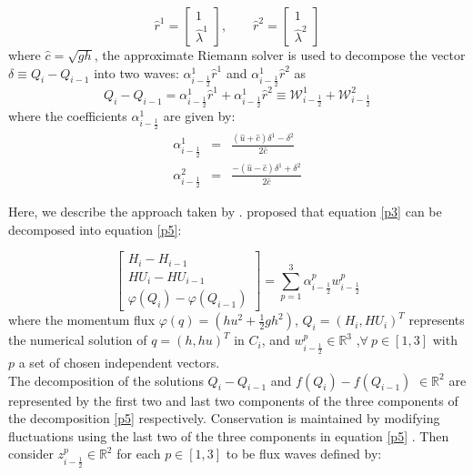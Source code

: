 \documentclass[10pt,a4paper]{article}
\begin{document}
	\begin{equation}
		\hat{r}^1 =  \begin{bmatrix} 1 \\ 	\hat{\lambda}^1 \end{bmatrix}, \qquad 	\hat{r}^2 =  
		\begin{bmatrix} 1 \\ 	\hat{\lambda}^2 \end{bmatrix}
		\label{vec}
	\end{equation}
	where $\hat{c} = \sqrt{gh}$, the approximate Riemann solver is used to decompose the vector  $ \delta \equiv Q_{i} - Q_{i-1}$ into two waves: $\alpha_{i-\frac{1}{2}}^{1} \hat{r}^1$ and $\alpha_{i-\frac{1}{2}}^{1} \hat{r}^2$ as 
	\begin{equation}
		Q_{i} - Q_{i-1} = \alpha_{i-\frac{1}{2}}^{1} \hat{r}^1 + \alpha_{i-\frac{1}{2}}^{1} \hat{r}^2 \equiv \mathcal{W}_{i-\frac{1}{2}}^{1} + \mathcal{W}_{i-\frac{1}{2}}^{2}
	\end{equation}
	where the coefficients $\alpha_{i-\frac{1}{2}}^{1}$ are given by:
	\begin{eqnarray}
		\alpha_{i-\frac{1}{2}}^{1} &=& \frac{(\hat{u} + \hat{c})\delta^{1} - \delta^2}{2\hat{c}}\\
		\alpha_{i-\frac{1}{2}}^{2} &=& \frac{-(\hat{u} - \hat{c})\delta^{1} + \delta^2}{2\hat{c}}
	\end{eqnarray}

	Here, we describe the approach taken by \citet{ge:2008}.  \citet{leveque2001class} proposed that equation \eqref{p3} can be decomposed into equation \eqref{p5}:

	\begin{equation}
		\begin{bmatrix} 
			H_{i} - H_{i-1}\\ 	HU_{i} - HU_{i-1} \\  \varphi(Q_{i}) - \varphi(Q_{i-1}) 
		\end{bmatrix} = \sum_{p=1}^{3} \alpha_{i-\frac{1}{2}}^{p} w_{i-\frac{1}{2}}^{p}
		\label{p5}
	\end{equation}
	where the momentum flux $\varphi(q) = (hu^{2} + \frac{1}{2} gh^{2})$, $Q_{i} = (H_{i},HU_{i})^{T}$ represents the numerical solution of $q = (h,hu)^{T}$ in $C_{i}$, and $w_{i-\frac{1}{2}}^{p} \in \mathbb{R}^{3}$ ,$\forall ~ p \in [1,3] $ with $p$ a set of chosen independent vectors. \\
	
	The decomposition of the solutions $Q_{i} - Q_{i-1} $  and  $f(Q_{i}) - f(Q_{i-1})$ $ \in  \mathbb{R}^{2}$ are represented by the first two and last two components of the three components of the decomposition \eqref{p5} respectively.  Conservation is maintained by modifying fluctuations using the last two of the three components  in equation \eqref{p5} \cite{ba-le-mi-ro:2003}. Then  consider $z_{i-\frac{1}{2}}^{p} \in \mathbb{R}^{2}$ for each $p \in [1,3]$ to be flux waves defined by:
	
\end{document}
